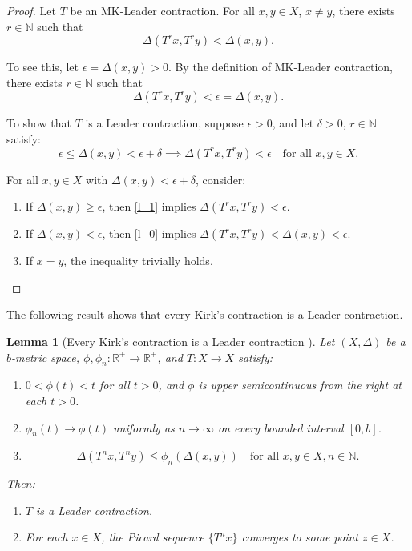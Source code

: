 \documentclass{birkjour}
\newtheorem{lem}[thm]{Lemma}
\theoremstyle{definition}
\theoremstyle{remark}
\numberwithin{equation}{section}
\begin{document}
\begin{proof}
Let \(T\) be an MK-Leader contraction. For all \(x,y \in X\), \(x \neq y\), there exists \(r \in \mathbb{N}\) such that
\begin{equation}\label{l_0}
\Delta(T^{r}x, T^{r}y) < \Delta(x,y).
\end{equation}

To see this, let \(\epsilon = \Delta(x,y) > 0\). By the definition of MK-Leader contraction, there exists \(r \in \mathbb{N}\) such that
\[
\Delta(T^{r}x, T^{r}y) < \epsilon = \Delta(x,y).
\]

To show that \(T\) is a Leader contraction, suppose \(\epsilon > 0\), and let \(\delta > 0\), \(r \in \mathbb{N}\) satisfy:
\begin{equation}\label{l_1}
\epsilon \leq \Delta(x,y) < \epsilon + \delta \implies \Delta(T^{r}x, T^{r}y) < \epsilon \quad \text{for all } x,y \in X.
\end{equation}

For all \(x,y \in X\) with \(\Delta(x,y) < \epsilon + \delta\), consider:
\begin{enumerate}
    \item If \(\Delta(x,y) \geq \epsilon\), then \eqref{l_1} implies \(\Delta(T^{r}x, T^{r}y) < \epsilon\).
    \item If \(\Delta(x,y) < \epsilon\), then \eqref{l_0} implies \(\Delta(T^{r}x, T^{r}y) < \Delta(x,y) < \epsilon\).
    \item If \(x = y\), the inequality trivially holds.
\end{enumerate}
\end{proof}
The following result shows that every Kirk's contraction is a Leader contraction.
\begin{lem}[Every Kirk's contraction is a Leader contraction ]\label{kirk_leader}
Let \((X,\Delta)\) be a \(b\)-metric space, \(\phi, \phi_n : \mathbb{R}^+ \to \mathbb{R}^+\), and \(T: X \to X\) satisfy:
\begin{enumerate}
    \item \(0 < \phi(t) < t\) for all \(t > 0\), and \(\phi\) is upper semicontinuous from the right at each \(t > 0\).
    \item \(\phi_n(t) \to \phi(t)\) uniformly as \(n \to \infty\) on every bounded interval \([0,b]\).
    \item
    \[
    \Delta(T^{n}x, T^{n}y) \leq \phi_n(\Delta(x,y)) \quad \text{for all } x,y \in X, n \in \mathbb{N}.
    \]
\end{enumerate}
Then:
\begin{enumerate}
    \item \(T\) is a Leader contraction.
    \item For each \(x \in X\), the Picard sequence \(\{T^{n} x\}\) converges to some point \(z \in X\).
\end{enumerate}
\end{lem}
\end{document}
